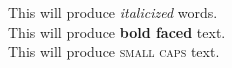 \documentclass[11pt]{article}
\begin{document}
This will produce \textit{italicized} words.\\
This will produce \textbf{bold faced} text.\\
This will produce \textsc{small caps} text.\\
\end{document}
